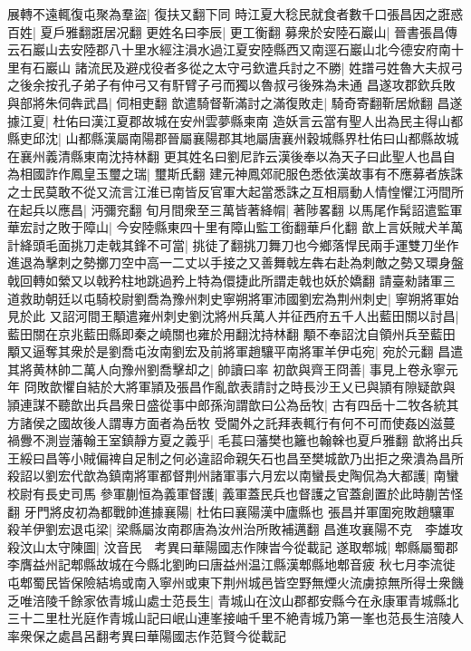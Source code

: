 展轉不遠輒復屯聚為羣盜|{
	復扶又翻下同}
時江夏大稔民就食者數千口張昌因之誑惑百姓|{
	夏戶雅翻誑居况翻}
更姓名曰李辰|{
	更工衡翻}
募衆於安陸石巖山|{
	晉書張昌傳云石巖山去安陸郡八十里水經注溳水過江夏安陸縣西又南逕石巖山北今德安府南十里有石巖山}
諸流民及避戍役者多從之太守弓欽遣兵討之不勝|{
	姓譜弓姓魯大夫叔弓之後余按孔子弟子有仲弓又有馯臂子弓而獨以魯叔弓後殊為未通}
昌遂攻郡欽兵敗與部將朱伺犇武昌|{
	伺相吏翻}
歆遣騎督靳滿討之滿復敗走|{
	騎奇寄翻靳居焮翻}
昌遂據江夏|{
	杜佑曰漢江夏郡故城在安州雲夢縣柬南}
造妖言云當有聖人出為民主得山都縣吏邱沈|{
	山都縣漢屬南陽郡晉屬襄陽郡其地屬唐襄州穀城縣界杜佑曰山都縣故城在襄州義清縣東南沈持林翻}
更其姓名曰劉尼詐云漢後奉以為天子曰此聖人也昌自為相國詐作鳳皇玉璽之瑞|{
	璽斯氏翻}
建元神鳳郊祀服色悉依漢故事有不應募者族誅之士民莫敢不從又流言江淮已南皆反官軍大起當悉誅之互相扇動人情惶懼江沔間所在起兵以應昌|{
	沔彌兖翻}
旬月間衆至三萬皆著絳㡌|{
	著陟畧翻}
以馬尾作髯詔遣監軍華宏討之敗于障山|{
	今安陸縣東四十里有障山監工銜翻華戶化翻}
歆上言妖賊犬羊萬計絳頭毛面挑刀走戟其鋒不可當|{
	挑徒了翻挑刀舞刀也今鄉落悍民兩手運雙刀坐作進退為擊刺之勢擲刀空中高一二丈以手接之又善舞戟左犇右赴為刺敵之勢又環身盤戟回轉如縈又以戟矜柱地跳過矜上特為儇捷此所謂走戟也妖於嬌翻}
請臺勑諸軍三道救助朝廷以屯騎校尉劉喬為豫州刺史寧朔將軍沛國劉宏為荆州刺史|{
	寧朔將軍始見於此}
又詔河間王顒遣雍州刺史劉沈將州兵萬人并征西府五千人出藍田關以討昌|{
	藍田關在京兆藍田縣即秦之嶢關也雍於用翻沈持林翻}
顒不奉詔沈自領州兵至藍田顒又逼奪其衆於是劉喬屯汝南劉宏及前將軍趙驤平南將軍羊伊屯宛|{
	宛於元翻}
昌遣其將黄林帥二萬人向豫州劉喬擊却之|{
	帥讀曰率}
初歆與齊王冏善|{
	事見上卷永寧元年}
冏敗歆懼自結於大將軍頴及張昌作亂歆表請討之時長沙王乂已與頴有隙疑歆與頴連謀不聽歆出兵昌衆日盛從事中郎孫洵謂歆曰公為岳牧|{
	古有四岳十二牧各統其方諸侯之國故後人謂專方面者為岳牧}
受閫外之託拜表輒行有何不可而使姦凶滋蔓禍釁不測豈藩翰王室鎮靜方夏之義乎|{
	毛萇曰藩樊也籬也翰榦也夏戶雅翻}
歆將出兵王綏曰昌等小賊偏禆自足制之何必違詔命親矢石也昌至樊城歆乃出拒之衆潰為昌所殺詔以劉宏代歆為鎮南將軍都督荆州諸軍事六月宏以南蠻長史陶侃為大都護|{
	南蠻校尉有長史司馬}
參軍蒯恒為義軍督護|{
	義軍蓋民兵也督護之官蓋創置於此時蒯苦怪翻}
牙門將皮初為都戰帥進據襄陽|{
	杜佑曰襄陽漢中廬縣也}
張昌并軍圍宛敗趙驤軍殺羊伊劉宏退屯梁|{
	梁縣屬汝南郡唐為汝州治所敗補邁翻}
昌進攻襄陽不克　李雄攻殺汶山太守陳圖|{
	汶音民　考異曰華陽國志作陳旹今從載記}
遂取郫城|{
	郫縣屬蜀郡李膺益州記郫縣故城在今縣北劉昫曰唐益州温江縣漢郫縣地郫音疲}
秋七月李流徙屯郫蜀民皆保險結塢或南入寧州或東下荆州城邑皆空野無煙火流虜掠無所得士衆饑乏唯涪陵千餘家依青城山處士范長生|{
	青城山在汶山郡都安縣今在永康軍青城縣北三十二里杜光庭作青城山記曰岷山連峯接岫千里不絶青城乃第一峯也范長生涪陵人率衆保之處昌呂翻考異曰華陽國志作范賢今從載記}
